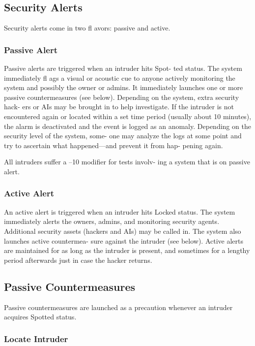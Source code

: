 \subsection{Security Alerts}

Security alerts come in two fl avors: passive and active.

\subsubsection{Passive Alert}

Passive alerts are triggered when an intruder hits Spot-
ted status. The system immediately fl ags a visual or 
acoustic cue to anyone actively monitoring the system 
and possibly the owner or admins. It immediately 
launches one or more passive countermeasures (see 
below). Depending on the system, extra security hack-
ers or AIs may be brought in to help investigate. If the 
intruder is not encountered again or located within a 
set time period (usually about 10 minutes), the alarm 
is deactivated and the event is logged as an anomaly. 
Depending on the security level of the system, some-
one may analyze the logs at some point and try to 
ascertain what happened—and prevent it from hap-
pening again.

All intruders suffer a –10 modifier for tests involv-
ing a system that is on passive alert.

\subsubsection{Active Alert}

An active alert is triggered when an intruder hits 
Locked status. The system immediately alerts the 
owners, admins, and monitoring security agents. 
Additional security assets (hackers and AIs) may be 
called in. The system also launches active countermea-
sure against the intruder (see below). Active alerts are 
maintained for as long as the intruder is present, and 
sometimes for a lengthy period afterwards just in case 
the hacker returns.

\subsection{Passive Countermeasures}

Passive countermeasures are launched as a precaution 
whenever an intruder acquires Spotted status.

\subsubsection{Locate Intruder}

